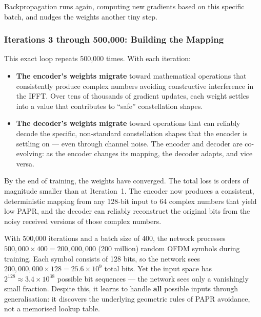 Backpropagation runs again, computing new gradients based on this
specific batch, and nudges the weights another tiny step.

\subsubsection{Iterations 3 through 500{,}000: Building the Mapping}

This exact loop repeats 500{,}000 times.  With each iteration:
\begin{itemize}
    \item \textbf{The encoder's weights migrate} toward mathematical
          operations that consistently produce complex numbers avoiding
          constructive interference in the IFFT.  Over tens of thousands
          of gradient updates, each weight settles into a value that
          contributes to ``safe'' constellation shapes.

    \item \textbf{The decoder's weights migrate} toward operations that
          can reliably decode the specific, non-standard constellation
          shapes that the encoder is settling on --- even through channel
          noise.  The encoder and decoder are co-evolving: as the encoder
          changes its mapping, the decoder adapts, and vice versa.
\end{itemize}

By the end of training, the weights have converged.  The total loss is
orders of magnitude smaller than at Iteration~1.  The encoder now
produces a consistent, deterministic mapping from any 128-bit input to
64 complex numbers that yield low PAPR, and the decoder can reliably
reconstruct the original bits from the noisy received versions of those
complex numbers.

\begin{workingexample}
    With 500{,}000 iterations and a batch size of 400, the network
    processes $500{,}000 \times 400 = 200{,}000{,}000$ (200 million)
    random OFDM symbols during training.  Each symbol consists of 128
    bits, so the network sees $200{,}000{,}000 \times 128
    = 25.6 \times 10^9$ total bits.  Yet the input space has
    $2^{128} \approx 3.4 \times 10^{38}$ possible bit sequences --- the
    network sees only a vanishingly small fraction.  Despite this,
    it learns to handle \textbf{all} possible inputs through
    generalisation: it discovers the underlying geometric rules of
    PAPR avoidance, not a memorised lookup table.
\end{workingexample}

